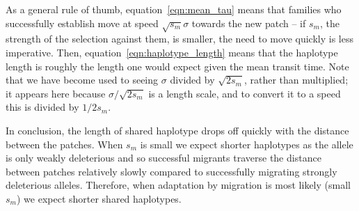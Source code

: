 \documentclass{article}
\begin{document}
As a general rule of thumb, equation~\eqref{eqn:mean_tau} means that families who successfully establish
move at speed $\sqrt{s_m} \sigma$ towards the new patch 
-- if $s_m$, the strength of the selection against them, is smaller, the need to move quickly is less imperative.
Then, equation~\eqref{eqn:haplotype_length} means that the haplotype length
is roughly the length one would expect given the mean transit time.
Note that we have become used to seeing $\sigma$ divided by $\sqrt{2s_m}$, rather than multiplied;
it appears here because $\sigma/\sqrt{2s_m}$ is a length scale, 
and to convert it to a speed this is divided by $1/2s_m$. 

In conclusion, the length of shared haplotype drops off quickly with the
distance between the patches. When $s_m$ is small we expect shorter
haplotypes as the allele is only weakly deleterious and so successful migrants
traverse the distance between patches relatively slowly 
compared to successfully migrating strongly deleterious alleles. 
Therefore, when adaptation by migration is most likely (small $s_m$) 
we expect shorter shared haplotypes.



\end{document}
